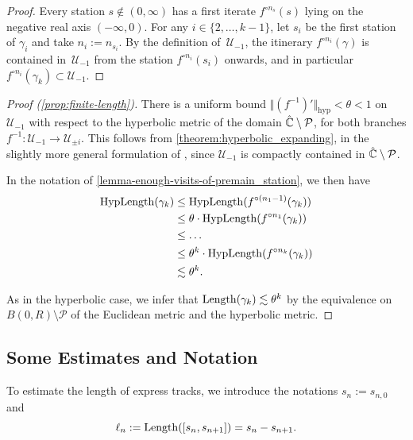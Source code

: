 \begin{proof}
	Every station $s \not \in (0, \infty)$ has a first iterate $f^{\circ n_s}(s)$ lying on the negative real axis $(-\infty, 0)$.
	For any $i \in \{2, \dots, k-1\}$, let $s_i$ be the first station of $\gamma _i$ and take $n_i := n_{s_i}$.
	By the definition of $\,\mathcal U_{-1}$, the itinerary $f^{\circ n_i}(\gamma)$ is contained in  $\,\mathcal U_{-1}$ from the station $f^{\circ n_i}(s_i)$ onwards, and in particular $f^{\circ n_i}(\gamma_k) \subset \mathcal U_{-1}$.
\end{proof}
\begin{proof}[Proof (\cref{prop:finite-length})] 
There is a uniform bound $\Vert (f^{-1})' \Vert _{\mathrm{hyp}}< \theta < 1$ on $\mathcal U_{-1}$
with respect to the hyperbolic metric of the domain $\hat{\mathbb C} \setminus \operatorname{\mathcal P}$, for both branches $f^{-1}: \mathcal U_{-1} \to \mathcal U_{\pm i}$. 
This follows from \cref{theorem:hyperbolic_expanding}, in the slightly more general formulation of \cite[Theorem 3.5]{mcmullen_1994},
since $\mathcal U_{-1}$ is compactly contained in $\hat{\mathbb C} \setminus \operatorname{\mathcal P}$.

In the notation of \cref{lemma-enough-visits-of-premain_station}, we then have 
\begin{equation}
	\begin{split}
	\operatorname{HypLength}(\gamma_k)  &  \leq \operatorname{HypLength}(f^{\circ (n_1-1)}(\gamma_k)) \\ & \leq \theta \cdot \operatorname{HypLength}(f^{\circ n_1}(\gamma_k))\\ & \leq  \dots
	\\ & \leq \theta^k \cdot \operatorname{HypLength}(f^{\circ n_k}(\gamma_k))
		\\ & \lesssim \theta^k.
	\end{split}
\end{equation}

As in the hyperbolic case, we infer that $\operatorname{Length}(\gamma_k) \lesssim \theta^k$ 
by the equivalence on $B(0,R) \setminus \mathcal P$ 
of the Euclidean metric and the hyperbolic metric. 
\end{proof}


\subsection{Some Estimates and Notation}

To estimate the length of express tracks, we introduce the notations $s_n := s_{n, 0}$ and 
\begin{equation}
	\ell_n := \operatorname{Length}([s_{n},s_{n+1}]) = s_{n}-s_{n+1}.
\end{equation}

